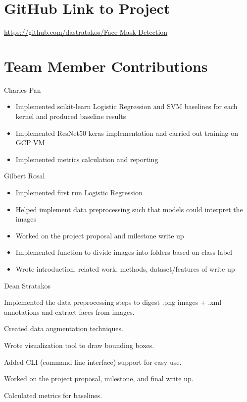 \documentclass{article}
\newcommand{\SubItem}[1]{
    {\setlength\itemindent{15pt} \item[-] #1}
}
\begin{document}
\section{GitHub Link to Project}
\href{https://github.com/dastratakos/Face-Mask-Detection}{https://github.com/dastratakos/Face-Mask-Detection}

\section{Team Member Contributions}
Charles Pan
\begin{itemize}
  \item Implemented scikit-learn Logistic Regression and SVM baselines for each kernel and produced baseline results
  \item Implemented ResNet50 keras implementation and carried out training on GCP VM
  \item Implemented metrics calculation and reporting
\end{itemize}

Gilbert Rosal
\begin{itemize}
  \item Implemented first run Logistic Regression
  \item Helped implement data preprocessing such that models could interpret the images
  \item Worked on the project proposal and milestone write up
  \item Implemented function to divide images into folders based on class label
  \item Wrote introduction, related work, methods, dataset/features of write up
\end{itemize}

Dean Stratakos
\begin{itemize}
  \item Implemented the data preprocessing steps to digest .png images + .xml annotations and extract faces from images.
    \SubItem{Created data augmentation techniques.}
    \SubItem{Wrote visualization tool to draw bounding boxes.}
  \item Added CLI (command line interface) support for easy use.
  \item Worked on the project proposal, milestone, and final write up.
  \item Calculated metrics for baselines.
\end{itemize}



\end{document}
